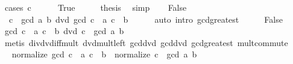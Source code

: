 \begin{isabellebody}
%
\isadelimproof
%
\endisadelimproof
%
\isatagproof
{}\isamarkupfalse%
\ {\isacharparenleft}{\kern0pt}cases\ {\isachardoublequoteopen}c\ {\isacharequal}{\kern0pt}\ {}{\isachardoublequoteclose}{\isacharparenright}{\kern0pt}\isanewline
\ \ \isamarkupfalse%
\ True\isanewline
\ \ \isamarkupfalse%
\ \isamarkupfalse%
\ {\isacharquery}{\kern0pt}thesis\ \isamarkupfalse%
\ simp\isanewline
{}\isamarkupfalse%
\isanewline
\ \ \isamarkupfalse%
\ False\isanewline
\ \ \isamarkupfalse%
\ \isamarkupfalse%
\ {\isacharasterisk}{\kern0pt}{\isacharcolon}{\kern0pt}\ {\isachardoublequoteopen}c\ {\isacharasterisk}{\kern0pt}\ gcd\ a\ b\ dvd\ gcd\ {\isacharparenleft}{\kern0pt}c\ {\isacharasterisk}{\kern0pt}\ a{\isacharparenright}{\kern0pt}\ {\isacharparenleft}{\kern0pt}c\ {\isacharasterisk}{\kern0pt}\ b{\isacharparenright}{\kern0pt}{\isachardoublequoteclose}\isanewline
\ \ \ \ \isamarkupfalse%
\ {\isacharparenleft}{\kern0pt}auto\ intro{\isacharcolon}{\kern0pt}\ gcd{\isacharunderscore}{\kern0pt}greatest{\isacharparenright}{\kern0pt}\isanewline
\ \ \isamarkupfalse%
\ \isamarkupfalse%
\ False\ {\isacharasterisk}{\kern0pt}\ \isamarkupfalse%
\ {\isachardoublequoteopen}gcd\ {\isacharparenleft}{\kern0pt}c\ {\isacharasterisk}{\kern0pt}\ a{\isacharparenright}{\kern0pt}\ {\isacharparenleft}{\kern0pt}c\ {\isacharasterisk}{\kern0pt}\ b{\isacharparenright}{\kern0pt}\ dvd\ c\ {\isacharasterisk}{\kern0pt}\ gcd\ a\ b{\isachardoublequoteclose}\isanewline
\ \ \ \ \isamarkupfalse%
\ {\isacharparenleft}{\kern0pt}metis\ div{\isacharunderscore}{\kern0pt}dvd{\isacharunderscore}{\kern0pt}iff{\isacharunderscore}{\kern0pt}mult\ dvd{\isacharunderscore}{\kern0pt}mult{\isacharunderscore}{\kern0pt}left\ gcd{\isacharunderscore}{\kern0pt}dvd{}\ gcd{\isacharunderscore}{\kern0pt}dvd{}\ gcd{\isacharunderscore}{\kern0pt}greatest\ mult{\isacharunderscore}{\kern0pt}commute{\isacharparenright}{\kern0pt}\isanewline
\ \ \isamarkupfalse%
\ \isamarkupfalse%
\ {\isachardoublequoteopen}normalize\ {\isacharparenleft}{\kern0pt}gcd\ {\isacharparenleft}{\kern0pt}c\ {\isacharasterisk}{\kern0pt}\ a{\isacharparenright}{\kern0pt}\ {\isacharparenleft}{\kern0pt}c\ {\isacharasterisk}{\kern0pt}\ b{\isacharparenright}{\kern0pt}{\isacharparenright}{\kern0pt}\ {\isacharequal}{\kern0pt}\ normalize\ {\isacharparenleft}{\kern0pt}c\ {\isacharasterisk}{\kern0pt}\ gcd\ a\ b{\isacharparenright}{\kern0pt}{\isachardoublequoteclose}\isanewline

\end{isabellebody}
